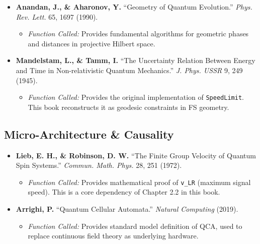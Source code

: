 \documentclass[11pt,a4paper,twoside]{book}
\begin{document}
\begin{itemize}
\item \textbf{Anandan, J., \& Aharonov, Y.} ``Geometry of Quantum Evolution.'' \textit{Phys. Rev. Lett.} 65, 1697 (1990).

\begin{itemize}
\item \textit{Function Called:} Provides fundamental algorithms for geometric phases and distances in projective Hilbert space.
\end{itemize}

\item \textbf{Mandelstam, L., \& Tamm, I.} ``The Uncertainty Relation Between Energy and Time in Non-relativistic Quantum Mechanics.'' \textit{J. Phys. USSR} 9, 249 (1945).

\begin{itemize}
\item \textit{Function Called:} Provides the original implementation of \texttt{SpeedLimit}. This book reconstructs it as geodesic constraints in FS geometry.
\end{itemize}
\end{itemize}

\subsection{Micro-Architecture \& Causality}

\begin{itemize}
\item \textbf{Lieb, E. H., \& Robinson, D. W.} ``The Finite Group Velocity of Quantum Spin Systems.'' \textit{Commun. Math. Phys.} 28, 251 (1972).

\begin{itemize}
\item \textit{Function Called:} Provides mathematical proof of \texttt{v\_LR} (maximum signal speed). This is a core dependency of Chapter 2.2 in this book.
\end{itemize}

\item \textbf{Arrighi, P.} ``Quantum Cellular Automata.'' \textit{Natural Computing} (2019).

\begin{itemize}
\item \textit{Function Called:} Provides standard model definition of QCA, used to replace continuous field theory as underlying hardware.
\end{itemize}
\end{itemize}
\end{document}
